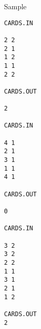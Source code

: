 Sample
\begin{verbatim}
CARDS.IN

2 2
2 1
1 2
1 1
2 2

CARDS.OUT

2
 
CARDS.IN

4 1
2 1
3 1
1 1
4 1

CARDS.OUT

0
 
CARDS.IN

3 2
3 2
2 2
1 1
3 1
2 1
1 2

CARDS.OUT
2
\end{verbatim}